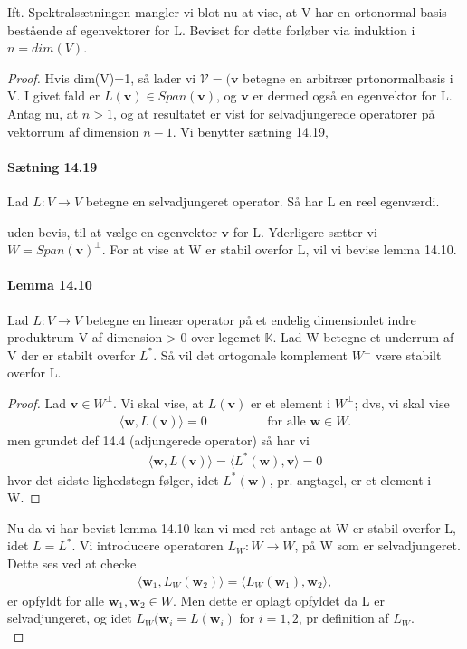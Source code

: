 \documentclass[paper=a4, fontsize=11pt]{scrartcl} %
\begin{document}
	Ift. Spektralsætningen mangler vi blot nu at vise, at V har en ortonormal basis bestående af egenvektorer for L.
	Beviset for dette forløber via induktion i $\textit{n}=dim(V)$.
	\begin{proof} Hvis dim(V)=1, så lader vi $\mathcal{V}=(\mathbf{v}$ betegne en arbitrær prtonormalbasis i V. I givet fald er $L(\mathbf{v})\in Span(\mathbf{v})$, og $\mathbf{v}$ er dermed også en egenvektor for L. \\
		Antag nu, at $n>1$, og at resultatet er vist for selvadjungerede operatorer på vektorrum af dimension $n-1$. Vi benytter sætning 14.19, 
		\begin{displayquote} 
			\item \paragraph{Sætning 14.19} Lad $L:V\rightarrow V$ betegne en selvadjungeret operator. Så har L en reel egenværdi.
		\end{displayquote}
		uden bevis, til at vælge en egenvektor $\mathbf{v}$ for L. Yderligere sætter vi $W=Span(\mathbf{v})^\bot$. For at vise at W er stabil overfor L, vil vi bevise lemma 14.10.
		\paragraph{Lemma 14.10} Lad $L:V\rightarrow V$ betegne en lineær operator på et endelig dimensionlet indre produktrum V af dimension > 0 over legemet $\mathbb{K}$. Lad W betegne et underrum af V der er stabilt overfor $L^*$. Så vil det ortogonale komplement $W^\bot$ være stabilt overfor L.
		\begin{proof}
			Lad $\mathbf{v}\in W^\bot$. Vi skal vise, at $L(\mathbf{v})$ er et element i $W^\bot$; dvs, vi skal vise
			\begin{align*}
				\langle\mathbf{w},L(\mathbf{v})\rangle=0 \hspace{2cm} \text{for alle } \mathbf{w}\in W.
			\end{align*}
			men grundet def 14.4 (adjungerede operator) så har vi 
			\begin{align*}
				\langle\mathbf{w},L(\mathbf{v})\rangle=\langle L^*(\mathbf{w}),\mathbf{v}\rangle=0
			\end{align*}
			hvor det sidste lighedstegn følger, idet $L^*(\mathbf{w})$, pr. angtagel, er et element i W.
		\end{proof}
		Nu da vi har bevist lemma 14.10 kan vi med ret antage at W er stabil overfor L, idet $L=L^*$. Vi introducere operatoren $L_W:W\rightarrow W$, på W som er selvadjungeret. Dette ses ved at checke
		\begin{align*}
			\langle\mathbf{w}_1,L_W(\mathbf{w}_2)\rangle=\langle L_W(\mathbf{w}_1),\mathbf{w}_2\rangle,
		\end{align*}
		er opfyldt for alle $\mathbf{w}_1,\mathbf{w}_2\in W$. Men dette er oplagt opfyldet da L er selvadjungeret, og idet $L_W(\mathbf{w}_i=L(\mathbf{w}_i)$ for $i=1,2$, pr definition af $L_W$.\\
		

\end{proof}
\end{document}
